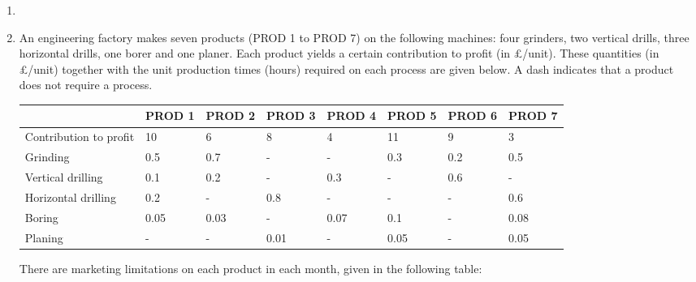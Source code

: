 \documentclass[12pt,a4paper]{article}
\makeatletter
\newtheorem*{solution}{Solution}
\theoremstyle{definition}
\renewenvironment{solution}[1][Solution] {\par\pushQED{\qed}\normalfont\topsep6\p@\@plus6\p@\relax\trivlist\item[\hskip\labelsep\bfseries#1\@addpunct{.}]\ignorespaces}{\popQED\endtrivlist\@endpefalse} \makeatother
\makeatother
\begin{document}
\begin{enumerate}
\begin{solution}
\begin{itemize}
        \end{itemize}
        
    \end{solution}

    \item
    An engineering factory makes seven products (PROD 1 to PROD 7) on the following machines: four grinders, two vertical drills, three horizontal drills, one borer and one planer. Each product yields a certain contribution to profit (in \pounds/unit). These quantities (in \pounds/unit) together with the unit production times (hours) required on each process are given below. A dash indicates that a product does not require a process.

    \begin{table}[htbp]
      \scriptsize
      \centering
      \renewcommand\arraystretch{1.1}
      \begin{tabular}{m{} m{}<{\centering} m{}<{\centering} m{}<{\centering} m{}<{\centering} m{}<{\centering} m{}<{\centering} m{}<{\centering}}
      \hline
       & \textbf{PROD 1} & \textbf{PROD 2} & \textbf{PROD 3} & \textbf{PROD 4} & \textbf{PROD 5} & \textbf{PROD 6} &  \textbf{PROD 7} \\\hline
      Contribution to profit & 10 & 6 & 8 & 4 & 11 & 9 & 3 \\
      Grinding & 0.5 & 0.7 & - & - & 0.3 & 0.2 & 0.5 \\
      Vertical drilling & 0.1 & 0.2 & - & 0.3 & - & 0.6 & - \\
      Horizontal drilling & 0.2 & - & 0.8 & - & - & - & 0.6 \\
      Boring & 0.05 & 0.03 & - & 0.07 & 0.1 & - & 0.08 \\
      Planing & - & - & 0.01 & - & 0.05 & - & 0.05 \\
      \hline
      \end{tabular}
    \end{table}

    There are marketing limitations on each product in each month, given in the following table:


\end{enumerate}
\end{document}
